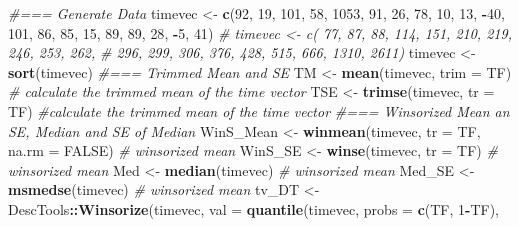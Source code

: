 \documentclass[
]{article}
\newenvironment{Shaded}{\begin{snugshade}}{\end{snugshade}}
\newcommand{\AttributeTok}[1]{\textcolor[rgb]{0.13,0.29,0.53}{#1}}
\newcommand{\CommentTok}[1]{\textcolor[rgb]{0.56,0.35,0.01}{\textit{#1}}}
\newcommand{\ConstantTok}[1]{\textcolor[rgb]{0.56,0.35,0.01}{#1}}
\newcommand{\DecValTok}[1]{\textcolor[rgb]{0.00,0.00,0.81}{#1}}
\newcommand{\FunctionTok}[1]{\textcolor[rgb]{0.13,0.29,0.53}{\textbf{#1}}}
\newcommand{\NormalTok}[1]{#1}
\newcommand{\OtherTok}[1]{\textcolor[rgb]{0.56,0.35,0.01}{#1}}
\newcommand{\SpecialCharTok}[1]{\textcolor[rgb]{0.81,0.36,0.00}{\textbf{#1}}}
\begin{document}
\begin{Shaded}
\begin{Highlighting}[]
  \CommentTok{\#=== Generate Data}
\NormalTok{  timevec }\OtherTok{\textless{}{-}} \FunctionTok{c}\NormalTok{(}\DecValTok{92}\NormalTok{, }\DecValTok{19}\NormalTok{, }\DecValTok{101}\NormalTok{, }\DecValTok{58}\NormalTok{, }\DecValTok{1053}\NormalTok{, }\DecValTok{91}\NormalTok{, }\DecValTok{26}\NormalTok{, }\DecValTok{78}\NormalTok{, }\DecValTok{10}\NormalTok{, }\DecValTok{13}\NormalTok{, }\SpecialCharTok{{-}}\DecValTok{40}\NormalTok{, }\DecValTok{101}\NormalTok{, }
               \DecValTok{86}\NormalTok{, }\DecValTok{85}\NormalTok{, }\DecValTok{15}\NormalTok{, }\DecValTok{89}\NormalTok{, }\DecValTok{89}\NormalTok{, }\DecValTok{28}\NormalTok{, }\SpecialCharTok{{-}}\DecValTok{5}\NormalTok{, }\DecValTok{41}\NormalTok{)}
  \CommentTok{\# timevec \textless{}{-} c( 77,  87,  88, 114, 151, 210, 219,  246, 253, 262, }
  \CommentTok{\#              296, 299, 306, 376, 428, 515, 666, 1310, 2611)}
\NormalTok{  timevec }\OtherTok{\textless{}{-}} \FunctionTok{sort}\NormalTok{(timevec)}
  \CommentTok{\#=== Trimmed Mean and SE}
\NormalTok{  TM      }\OtherTok{\textless{}{-}} \FunctionTok{mean}\NormalTok{(timevec, }\AttributeTok{trim =}\NormalTok{ TF) }\CommentTok{\# calculate the trimmed mean of the time vector}
\NormalTok{  TSE     }\OtherTok{\textless{}{-}} \FunctionTok{trimse}\NormalTok{(timevec, }\AttributeTok{tr =}\NormalTok{ TF) }\CommentTok{\#calculate the trimmed mean of the time vector}
  \CommentTok{\#=== Winsorized Mean an SE, Median and SE of Median}
\NormalTok{  WinS\_Mean }\OtherTok{\textless{}{-}} \FunctionTok{winmean}\NormalTok{(timevec, }\AttributeTok{tr =}\NormalTok{ TF, }\AttributeTok{na.rm =} \ConstantTok{FALSE}\NormalTok{) }\CommentTok{\# winsorized mean}
\NormalTok{  WinS\_SE   }\OtherTok{\textless{}{-}} \FunctionTok{winse}\NormalTok{(timevec, }\AttributeTok{tr =}\NormalTok{ TF) }\CommentTok{\# winsorized mean}
\NormalTok{  Med       }\OtherTok{\textless{}{-}} \FunctionTok{median}\NormalTok{(timevec) }\CommentTok{\# winsorized mean}
\NormalTok{  Med\_SE    }\OtherTok{\textless{}{-}} \FunctionTok{msmedse}\NormalTok{(timevec) }\CommentTok{\# winsorized mean}
\NormalTok{  tv\_DT     }\OtherTok{\textless{}{-}}\NormalTok{ DescTools}\SpecialCharTok{::}\FunctionTok{Winsorize}\NormalTok{(timevec, }
                                    \AttributeTok{val =} \FunctionTok{quantile}\NormalTok{(timevec, }
                                                   \AttributeTok{probs =} \FunctionTok{c}\NormalTok{(TF, }\DecValTok{1}\SpecialCharTok{{-}}\NormalTok{TF),}

\end{Highlighting}
\end{Shaded}
\end{document}
